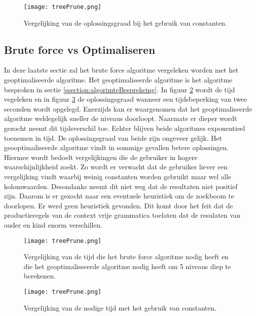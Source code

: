 \documentclass[Main.tex]{subfiles}
\begin{document}
\begin{figure}
\centering
\texttt{[image: treePrune.png]} %
\caption{Vergelijking van de oplossingsgraad bij het gebruik van constanten.} \label{fig:gewichtenOplossingsgraad}
\end{figure}

\subsection{Brute force vs Optimaliseren}
In deze laatste sectie zal het brute force algoritme vergeleken worden met het geoptimaliseerde algoritme. Het geoptimaliseerde algoritme is het algoritme besproken in sectie \ref{ssection:algorimteBesprekeing}. In figuur \ref{fig:brutevsopttijd} wordt de tijd vegeleken en in figuur \ref{fig:brutevsoptopl} de oplossingsgraad wanneer een tijdsbeperking van twee seconden wordt opgelegd. Enerzijds kan er waargenomen dat het geoptimaliseerde algoritme weldegelijk sneller de niveaus doorloopt. Naarmate er dieper wordt gezocht neemt dit tijdsverschil toe. Echter blijven beide algoritmes exponentieel toenemen in tijd. De oplossingsgraad van beide zijn ongeveer gelijk. Het geooptimaliseerde algoritme vindt in sommige gevallen betere oplossingen. Hiermee wordt bedoelt vergelijkingen die de gebruiker in hogere waarschijnlijkheid zoekt. Zo wordt er verwacht dat de gebruiker liever een vergelijking vindt waarbij weinig constanten worden gebruikt maar wel alle kolomwaarden. Desondanks neemt dit niet weg dat de resultaten niet positief zijn. Daarom is er gezocht naar een eventuele heuristiek om de zoekboom te doorlopen. Er werd geen heuristiek gevonden. Dit komt door het feit dat de productieregels van de context vrije grammatica toelaten dat de resulaten van ouder en kind enorm verschillen.


\begin{figure}
\centering
\texttt{[image: treePrune.png]} %
\caption{Vergelijking van de tijd die het brute force algoritme nodig heeft en die het geoptimalisseerde algoritme nodig heeft om 5 niveaus diep te berekenen.} \label{fig:brutevsopttijd}
\end{figure}

\begin{figure}
\centering
\texttt{[image: treePrune.png]} %
\caption{Vergelijking van de nodige tijd met het gebruik van constanten.} \label{fig:brutevsoptopl}
\end{figure}
\end{document}
